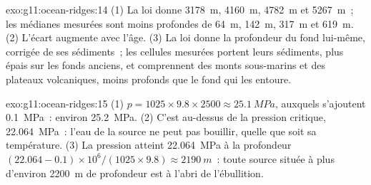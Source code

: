 \begin{solution}{exo:g11:ocean-ridges:14}
(1) La loi donne \qty{3178}{m}, \qty{4160}{m}, \qty{4782}{m} et
\qty{5267}{m}~; les médianes mesurées sont moins profondes de
\qty{64}{m}, \qty{142}{m}, \qty{317}{m} et \qty{619}{m}. (2) L'écart
augmente avec l'âge. (3) La loi donne la profondeur du fond lui-même,
corrigée de ses sédiments~; les cellules mesurées portent leurs sédiments,
plus épais sur les fonds anciens, et comprennent des monts sous-marins et
des plateaux volcaniques, moins profonds que le fond qui les entoure.
\end{solution}

\begin{solution}{exo:g11:ocean-ridges:15}
(1) $p = 1025 \times 9.8 \times 2500 \approx \qty{25.1}{MPa}$, auxquels
s'ajoutent \qty{0.1}{MPa}~: environ \qty{25.2}{MPa}. (2) C'est au-dessus de la pression
critique, \qty{22.064}{MPa}~: l'eau de la source ne peut pas bouillir,
quelle que soit sa température. (3) La pression atteint \qty{22.064}{MPa} à
la profondeur
$(22.064 - 0.1) \times 10^6/(1025 \times 9.8) \approx \qty{2190}{m}$~:
toute source située à plus d'environ \qty{2200}{m} de profondeur est à
l'abri de l'ébullition.
\end{solution}

